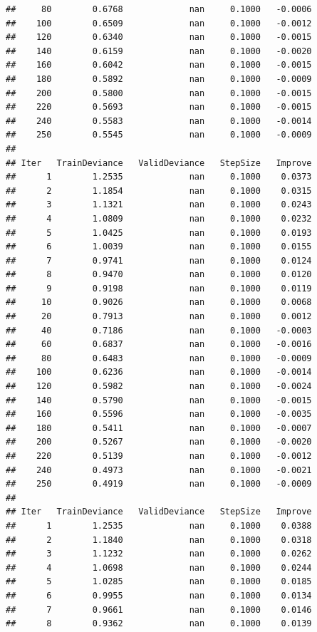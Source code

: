 \documentclass[]{book}
\begin{document}
\begin{verbatim}
##     80        0.6768             nan     0.1000   -0.0006
##    100        0.6509             nan     0.1000   -0.0012
##    120        0.6340             nan     0.1000   -0.0015
##    140        0.6159             nan     0.1000   -0.0020
##    160        0.6042             nan     0.1000   -0.0015
##    180        0.5892             nan     0.1000   -0.0009
##    200        0.5800             nan     0.1000   -0.0015
##    220        0.5693             nan     0.1000   -0.0015
##    240        0.5583             nan     0.1000   -0.0014
##    250        0.5545             nan     0.1000   -0.0009
## 
## Iter   TrainDeviance   ValidDeviance   StepSize   Improve
##      1        1.2535             nan     0.1000    0.0373
##      2        1.1854             nan     0.1000    0.0315
##      3        1.1321             nan     0.1000    0.0243
##      4        1.0809             nan     0.1000    0.0232
##      5        1.0425             nan     0.1000    0.0193
##      6        1.0039             nan     0.1000    0.0155
##      7        0.9741             nan     0.1000    0.0124
##      8        0.9470             nan     0.1000    0.0120
##      9        0.9198             nan     0.1000    0.0119
##     10        0.9026             nan     0.1000    0.0068
##     20        0.7913             nan     0.1000    0.0012
##     40        0.7186             nan     0.1000   -0.0003
##     60        0.6837             nan     0.1000   -0.0016
##     80        0.6483             nan     0.1000   -0.0009
##    100        0.6236             nan     0.1000   -0.0014
##    120        0.5982             nan     0.1000   -0.0024
##    140        0.5790             nan     0.1000   -0.0015
##    160        0.5596             nan     0.1000   -0.0035
##    180        0.5411             nan     0.1000   -0.0007
##    200        0.5267             nan     0.1000   -0.0020
##    220        0.5139             nan     0.1000   -0.0012
##    240        0.4973             nan     0.1000   -0.0021
##    250        0.4919             nan     0.1000   -0.0009
## 
## Iter   TrainDeviance   ValidDeviance   StepSize   Improve
##      1        1.2535             nan     0.1000    0.0388
##      2        1.1840             nan     0.1000    0.0318
##      3        1.1232             nan     0.1000    0.0262
##      4        1.0698             nan     0.1000    0.0244
##      5        1.0285             nan     0.1000    0.0185
##      6        0.9955             nan     0.1000    0.0134
##      7        0.9661             nan     0.1000    0.0146
##      8        0.9362             nan     0.1000    0.0139

\end{verbatim}
\end{document}
